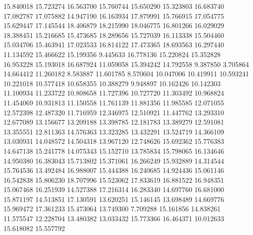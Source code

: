 15.840018
15.723274
16.563700
15.760744
15.650290
15.323803
16.683740
17.082787
17.075882
14.947190
16.163934
17.879991
15.766915
17.054775
15.629447
17.145544
18.406879
18.215990
18.046775
16.801266
16.029029
18.388451
15.216685
15.473685
18.289656
15.727039
16.113338
15.504460
15.034706
15.463941
17.023533
16.814122
17.473365
18.693563
16.297440
11.134592
15.466622
15.199356
9.445633
16.778136
15.220824
15.352828
16.953228
15.193018
16.687924
11.059058
15.394242
14.792558
9.387850
3.705864
14.664412
11.260182
8.583887
11.601785
8.570604
10.047006
10.419911
10.593241
10.221018
10.577418
10.658355
10.388279
9.948897
10.162426
10.142303
11.100934
11.233722
10.808658
11.727396
10.727720
11.303492
10.968824
11.454069
10.931813
11.150558
11.761139
11.881356
11.985585
12.071055
12.572398
12.487320
11.716959
12.346975
12.510921
11.447762
13.293310
12.677089
13.156677
13.209188
13.398785
12.181783
13.389279
12.591081
13.355551
12.811363
14.576363
13.323285
13.432291
13.524719
14.366109
13.030931
14.048572
14.504318
13.967120
12.748626
15.692362
15.776383
14.647138
15.241778
14.075343
15.152710
13.785834
15.798065
16.134646
14.950380
16.383043
15.713802
15.371061
16.266249
15.932889
14.314544
15.764536
13.492484
16.988007
15.444388
16.240685
14.924436
15.061146
16.542838
15.806230
18.707996
15.523062
17.833619
16.881522
16.948351
15.067468
16.251939
14.527388
17.216314
16.283340
14.697760
16.681000
15.871197
14.513851
17.130591
13.620251
15.146145
13.698489
14.669776
15.969472
17.361233
15.473064
13.749300
7.709288
15.161856
14.838261
11.575547
12.228704
13.480382
13.033432
15.773366
16.464371
10.012633
15.618082
15.557792
